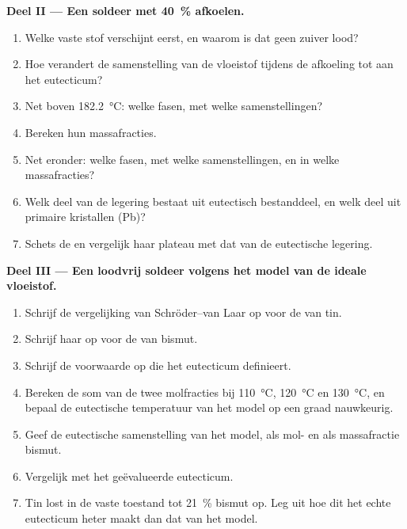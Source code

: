 \begin{problem}
\medskip
\noindent\textbf{Deel II --- Een soldeer met 40~\% afkoelen.}
\begin{enumerate}[resume]
  \item Welke vaste stof verschijnt eerst, en waarom is dat geen zuiver lood?
  \item Hoe verandert de samenstelling van de vloeistof tijdens de afkoeling tot
        aan het eutecticum?
  \item Net boven \qty{182.2}{\degreeCelsius}: welke fasen, met welke
        samenstellingen?
  \item Bereken hun massafracties.
  \item Net eronder: welke fasen, met welke samenstellingen, en in welke
        massafracties?
  \item Welk deel van de legering bestaat uit eutectisch bestanddeel, en welk
        deel uit primaire kristallen (Pb)?
  \item Schets de  en vergelijk haar plateau met dat van de
        eutectische legering.
\end{enumerate}

\medskip
\noindent\textbf{Deel III --- Een loodvrij soldeer volgens het model van de ideale vloeistof.}
\begin{enumerate}[resume]
  \item Schrijf de vergelijking van Schröder--van Laar op voor de  van tin.
  \item Schrijf haar op voor de  van bismut.
  \item Schrijf de voorwaarde op die het eutecticum definieert.
  \item Bereken de som van de twee molfracties bij \qty{110}{\degreeCelsius},
        \qty{120}{\degreeCelsius} en \qty{130}{\degreeCelsius}, en bepaal de
        eutectische temperatuur van het model op een graad nauwkeurig.
  \item Geef de eutectische samenstelling van het model, als mol- en als massafractie
        bismut.
  \item Vergelijk met het geëvalueerde eutecticum.
  \item Tin lost in de vaste toestand tot 21~\% bismut op. Leg uit hoe dit
        het echte eutecticum heter maakt dan dat van het model.
\end{enumerate}


\end{problem}
